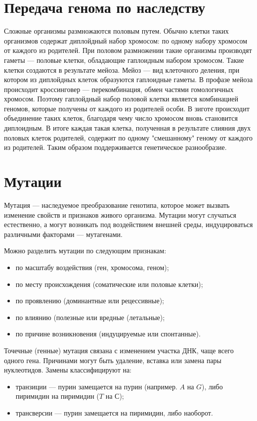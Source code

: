 \section {Передача генома по наследству}
Сложные организмы размножаются половым путем. Обычно клетки таких организмов содержат диплойдный набор хромосом: по одному набору хромосом от каждого из родителей. При половом размножении такие организмы производят гаметы --- половые клетки, обладающие гаплоидным набором хромосом. Такие клетки создаются в результате мейоза. Мейоз --- вид клеточного деления, при котором из диплойдных клеток образуются гаплоидные гаметы. В профазе мейоза происходит кроссинговер --- перекомбинация, обмен частями гомологичных хромосом.  Поэтому гаплойдный набор половой клетки является комбинацией геномов, которые получены от каждого из родителей особи. В зиготе происходит объединение таких клеток, благодаря чему число хромосом вновь становится диплоидным. В итоге каждая такая клетка, полученная в результате слияния двух половых клеток родителей, содержит по одному "смешанному" геному от каждого из родителей. Таким образом поддерживается генетическое разнообразие.

\section {Мутации}
Мутация — наследуемое преобразование генотипа, которое может вызвать изменение свойств и признаков живого организма. Мутации могут случаться естественно, а могут возникать под воздействием внешней среды, индуцироваться различными факторами — мутагенами. 

Можно разделить мутации по следующим признакам:
\begin{itemize}
\item по масштабу воздействия (ген, хромосома, геном);
\item по месту происхождения (соматические или половые клетки);
\item по проявлению (доминантные или рецессивные);
\item по влиянию (полезные или вредные (летальные);
\item по причине возникновения (индуцируемые или спонтанные). 
\end{itemize}

Точечные (генные) мутация связана с изменением участка ДНК, чаще всего одного гена. Причинами могут быть удаление, вставка или замена пары нуклеотидов. Замены классифицируют на:
\begin{itemize}
\item транзиции --- пурин замещается на пурин (например. $A$ на $G$), либо пиримидин на пиримидин ($T$ на $С$);
\item трансверсии --- пурин замещается на пиримидин, либо наоборот.
\end{itemize}

